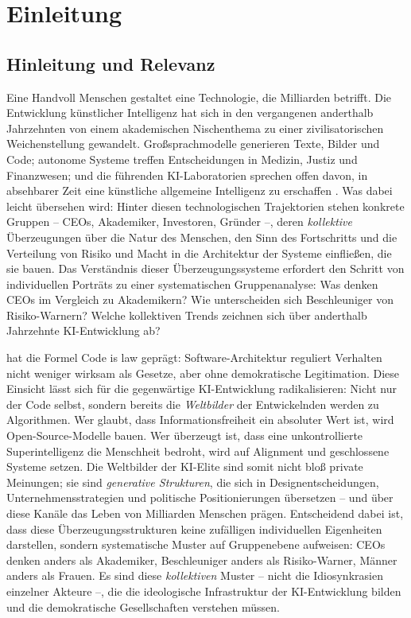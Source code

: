 \documentclass[12pt,a4paper]{article}
\begin{document}
\section{Einleitung}
\label{sec:einleitung}

\subsection{Hinleitung und Relevanz}
\label{sec:einleitung:relevanz}

Eine Handvoll Menschen gestaltet eine Technologie, die Milliarden betrifft. Die Entwicklung k\"unstlicher Intelligenz hat sich in den vergangenen anderthalb Jahrzehnten von einem akademischen Nischenthema zu einer zivilisatorischen Weichenstellung gewandelt. Gro\ss{}sprachmodelle generieren Texte, Bilder und Code; autonome Systeme treffen Entscheidungen in Medizin, Justiz und Finanzwesen; und die f\"uhrenden KI-Laboratorien sprechen offen davon, in absehbarer Zeit eine k\"unstliche allgemeine Intelligenz zu erschaffen \citep{OpenAI2023Charter, AnthropicCoreViews2023, Bengio2024}. Was dabei leicht \"ubersehen wird: Hinter diesen technologischen Trajektorien stehen konkrete Gruppen -- CEOs, Akademiker, Investoren, Gr\"under --, deren \emph{kollektive} \"Uberzeugungen \"uber die Natur des Menschen, den Sinn des Fortschritts und die Verteilung von Risiko und Macht in die Architektur der Systeme einflie\ss{}en, die sie bauen. Das Verst\"andnis dieser \"Uberzeugungssysteme erfordert den Schritt von individuellen Portr\"ats zu einer systematischen Gruppenanalyse: Was denken CEOs im Vergleich zu Akademikern? Wie unterscheiden sich Beschleuniger von Risiko-Warnern? Welche kollektiven Trends zeichnen sich \"uber anderthalb Jahrzehnte KI-Entwicklung ab?

\citet{Lessig1999} hat die Formel \glqq Code is law\grqq{} gepr\"agt: Software-Architektur reguliert Verhalten nicht weniger wirksam als Gesetze, aber ohne demokratische Legitimation. Diese Einsicht l\"asst sich f\"ur die gegenw\"artige KI-Entwicklung radikalisieren: Nicht nur der Code selbst, sondern bereits die \emph{Weltbilder} der Entwickelnden werden zu Algorithmen. Wer glaubt, dass Informationsfreiheit ein absoluter Wert ist, wird Open-Source-Modelle bauen. Wer \"uberzeugt ist, dass eine unkontrollierte Superintelligenz die Menschheit bedroht, wird auf Alignment und geschlossene Systeme setzen. Die Weltbilder der KI-Elite sind somit nicht blo\ss{} private Meinungen; sie sind \emph{generative Strukturen}, die sich in Designentscheidungen, Unternehmensstrategien und politische Positionierungen \"ubersetzen -- und \"uber diese Kan\"ale das Leben von Milliarden Menschen pr\"agen. Entscheidend dabei ist, dass diese \"Uberzeugungsstrukturen keine zuf\"alligen individuellen Eigenheiten darstellen, sondern systematische Muster auf Gruppenebene aufweisen: CEOs denken anders als Akademiker, Beschleuniger anders als Risiko-Warner, M\"anner anders als Frauen. Es sind diese \emph{kollektiven} Muster -- nicht die Idiosynkrasien einzelner Akteure --, die die ideologische Infrastruktur der KI-Entwicklung bilden und die demokratische Gesellschaften verstehen m\"ussen.
\end{document}
